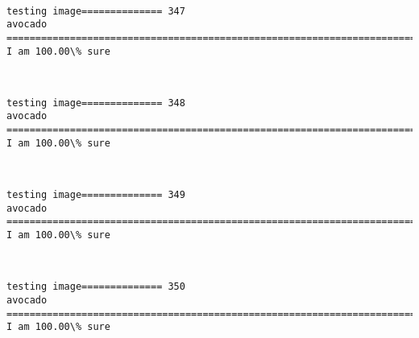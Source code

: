 \documentclass[11pt]{article}
\begin{document}
    \begin{center}
    \end{center}
    { \hspace*{\fill} \\}
    
    \begin{Verbatim}[commandchars=\\\{\}]
testing image============== 347
avocado
============================================================================
I am 100.00\% sure

    \end{Verbatim}

    \begin{center}
    \end{center}
    { \hspace*{\fill} \\}
    
    \begin{Verbatim}[commandchars=\\\{\}]
testing image============== 348
avocado
============================================================================
I am 100.00\% sure

    \end{Verbatim}

    \begin{center}
    \end{center}
    { \hspace*{\fill} \\}
    
    \begin{Verbatim}[commandchars=\\\{\}]
testing image============== 349
avocado
============================================================================
I am 100.00\% sure

    \end{Verbatim}

    \begin{center}
    \end{center}
    { \hspace*{\fill} \\}
    
    \begin{Verbatim}[commandchars=\\\{\}]
testing image============== 350
avocado
============================================================================
I am 100.00\% sure

    \end{Verbatim}
\end{document}
